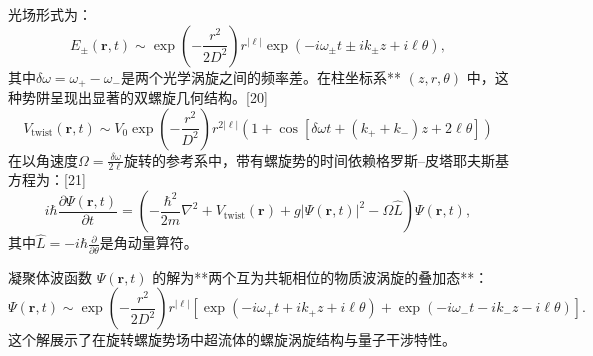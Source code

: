 光场形式为：
$$
E_{\pm}(\mathbf{r}, t) \sim \exp\left( -\frac{r^2}{2D^2} \right) r^{|\ell|} \exp\left( -i \omega_{\pm} t \pm i k_{\pm} z + i \ell \theta \right),~
$$
其中$\delta \omega = \omega_+ - \omega_-$是两个光学涡旋之间的频率差。在柱坐标系** $(z, r, \theta)$ 中，这种势阱呈现出显著的双螺旋几何结构。[20]
$$
V_{\text{twist}}(\mathbf{r}, t) \sim V_0 \exp\left(-\frac{r^2}{D^2}\right) r^{2|\ell|} \left(1 + \cos[\delta\omega t + (k_+ + k_-)z + 2\ell \theta] \right)~
$$
在以角速度$\Omega = \frac{\delta\omega}{2\ell}$旋转的参考系中，带有螺旋势的时间依赖格罗斯–皮塔耶夫斯基方程为：[21]
$$
i\hbar \frac{\partial \Psi(\mathbf{r}, t)}{\partial t} = \left( -\frac{\hbar^2}{2m} \nabla^2 + V_{\text{twist}}(\mathbf{r}) + g |\Psi(\mathbf{r}, t)|^2 - \Omega \hat{L} \right) \Psi(\mathbf{r}, t),~
$$
其中$\hat{L} = -i\hbar \frac{\partial}{\partial \theta}$是角动量算符。

凝聚体波函数 $\Psi(\mathbf{r}, t)$ 的解为**两个互为共轭相位的物质波涡旋的叠加态**：
$$
\Psi(\mathbf{r}, t) \sim \exp\left(-\frac{r^2}{2D^2}\right) r^{|\ell|} \left[ \exp(-i\omega_+ t + i k_+ z + i\ell \theta) + \exp(-i\omega_- t - i k_- z - i\ell \theta) \right].~
$$
这个解展示了在旋转螺旋势场中超流体的螺旋涡旋结构与量子干涉特性。
